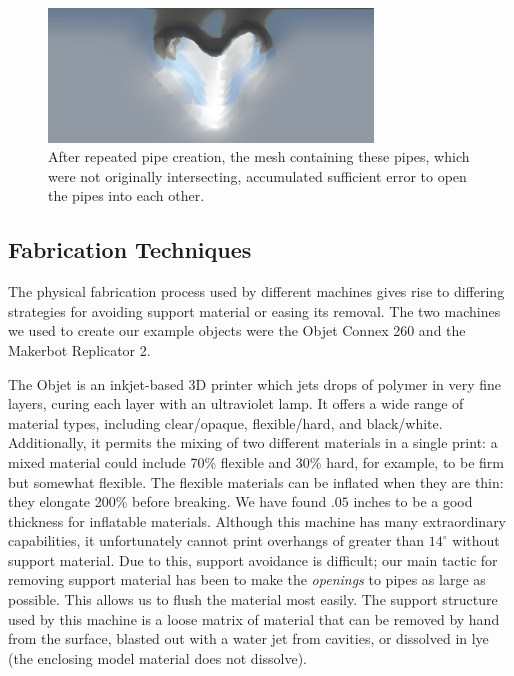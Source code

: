 \begin{figure}[h!]
\centering
    \includegraphics[width=3.4in]{figures/voxelize-fail.png}
\caption{After repeated pipe creation, the mesh containing these pipes, which were not originally intersecting, accumulated sufficient error to open the pipes into each other. }
\label{fig:voxelize}
\end{figure}


\subsection{Fabrication Techniques}

  
The physical fabrication process used by different machines gives rise to differing strategies for avoiding support material or easing its removal.  The two machines we used to create our example objects were the Objet Connex 260 and the Makerbot Replicator 2.

The Objet is an inkjet-based 3D printer which jets drops of polymer in very fine layers, curing each layer with an ultraviolet lamp.  It offers a wide range of material types, including clear/opaque, flexible/hard, and black/white.  Additionally, it permits the mixing of two different materials in a single print: a mixed material could include 70\% flexible and 30\% hard, for example, to be firm but somewhat flexible.  The flexible materials can be inflated when they are thin: they elongate 200\% before breaking.  We have found $.05$ inches to be a good thickness for inflatable materials.  Although this machine has many extraordinary capabilities, it unfortunately cannot print overhangs of greater than $14^{\circ}$ without support material.  Due to this, support avoidance is difficult; our main tactic for removing support material has been to make the \emph{openings} to pipes as large as possible.  This allows us to flush the material most easily.  The support structure used by this machine is a loose matrix of material that can be removed by hand from the surface, blasted out with a water jet from cavities, or dissolved in lye (the enclosing model material does not dissolve).


